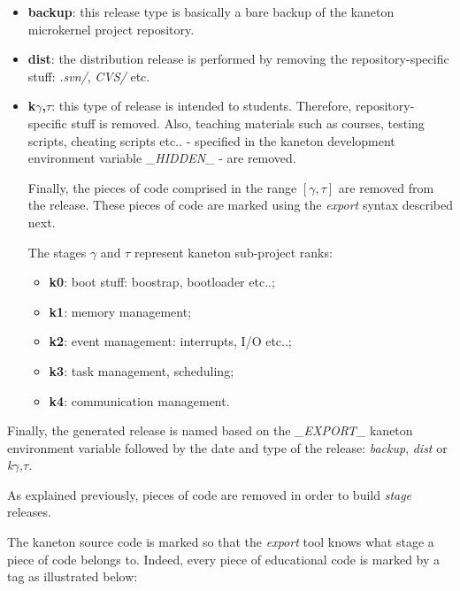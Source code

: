 \begin{itemize}
  \item
    \textbf{backup}: this release type is basically a bare backup of
    the kaneton microkernel project repository.
  \item
    \textbf{dist}: the distribution release is performed by removing
    the repository-specific stuff: \textit{.svn/}, \textit{CVS/} etc.
  \item
    \textbf{k}$\gamma$\textbf{,}$\tau$: this type of release is intended
    to students. Therefore, repository-specific stuff is removed. Also,
    teaching materials such as courses, testing scripts, cheating scripts
    etc.. - specified in the kaneton development environment variable
    \textit{\_HIDDEN\_} - are removed.

    \-

    Finally, the pieces of code comprised in the range $[\gamma,\tau]$
    are removed from the release. These pieces of code are marked using the
    \textit{export} syntax described next.

    \-

    The stages $\gamma$ and $\tau$ represent kaneton sub-project ranks:

    \begin{itemize}
      \item
	\textbf{k0}: boot stuff: boostrap, bootloader etc..;
      \item
	\textbf{k1}: memory management;
      \item
	\textbf{k2}: event management: interrupts, I/O etc..;
      \item
	\textbf{k3}: task management, scheduling;
      \item
	\textbf{k4}: communication management.
    \end{itemize}
\end{itemize}

Finally, the generated release is named based on the \textit{\_EXPORT\_}
kaneton environment variable followed by the date and type of the release:
\textit{backup}, \textit{dist} or \textit{k}$\gamma$\textit{,}$\tau$.



As explained previously, pieces of code are removed in order to build
\textit{stage} releases.

The kaneton source code is marked so that the \textit{export} tool knows
what stage a piece of code belongs to. Indeed, every piece of educational
code is marked by a tag as illustrated below:

